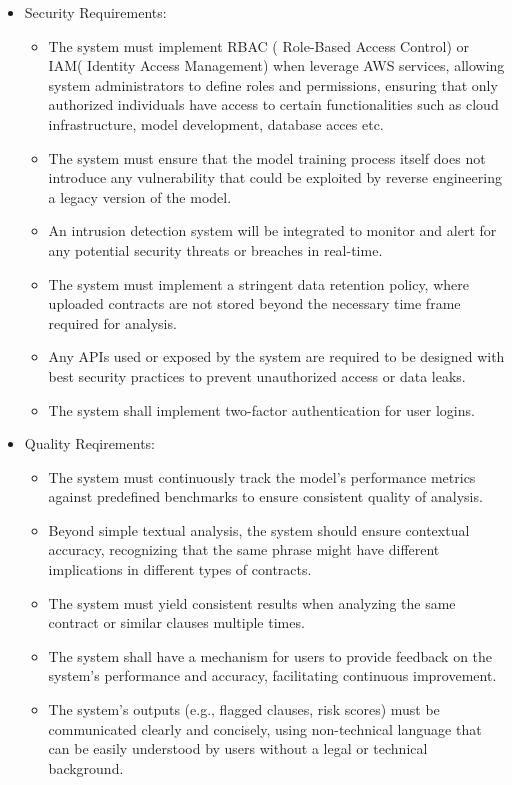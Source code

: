 \begin{itemize}
\begin{itemize}
    \end{itemize}
    \item Security Requirements: 
    \begin{itemize}
        \item The system must implement RBAC ( Role-Based Access Control) or IAM( Identity Access Management) when leverage AWS services, allowing system administrators to define roles and permissions, ensuring that only authorized individuals have access to certain functionalities such as cloud infrastructure, model development, database acces etc. 
        \item The system must ensure that the model training process itself does not introduce any vulnerability that could be exploited by reverse engineering a legacy version of the model. 
        \item An intrusion detection system will be integrated to monitor and alert for any potential security threats or breaches in real-time.
        \item The system must implement a stringent data retention policy, where uploaded contracts are not stored beyond the necessary time frame required for analysis.
        \item Any APIs used or exposed by the system are required to be designed with best security practices to prevent unauthorized access or data leaks.
        \item The system shall implement two-factor authentication for user logins.












    \end{itemize}
    \item Quality Reqirements: 
    \begin{itemize}
        \item The system must continuously track the model’s performance metrics against predefined benchmarks to ensure consistent quality of analysis.
        \item Beyond simple textual analysis, the system should ensure contextual accuracy, recognizing that the same phrase might have different implications in different types of contracts.
        \item The system must yield consistent results when analyzing the same contract or similar clauses multiple times.
        \item The system shall have a mechanism for users to provide feedback on the system's performance and accuracy, facilitating continuous improvement.
        \item The system's outputs (e.g., flagged clauses, risk scores) must be communicated clearly and concisely, using non-technical language that can be easily understood by users without a legal or technical background.














\end{itemize}
\end{itemize}
